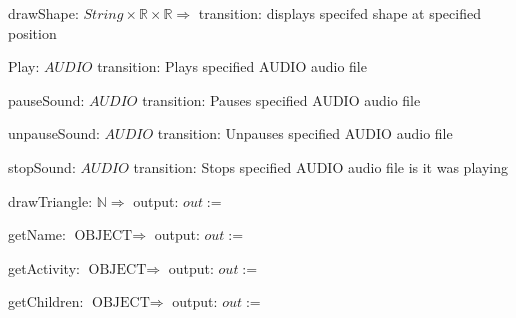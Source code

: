 \documentclass[12pt]{article}
\begin{document}
\noindent drawShape: $String\times\mathbb{R}\times\mathbb{R}\Rightarrow$
\noindent transition: displays specifed shape at specified position

\noindent Play: $AUDIO$
\noindent transition: Plays specified AUDIO audio file

\noindent pauseSound: $AUDIO$
\noindent transition: Pauses specified AUDIO audio file

\noindent unpauseSound: $AUDIO$
\noindent transition: Unpauses specified AUDIO audio file

\noindent stopSound: $AUDIO$
\noindent transition: Stops specified AUDIO audio file is it was playing



\noindent drawTriangle: $ \mathbb{N} \Rightarrow $
\noindent output: $out := $

\noindent getName: $ \mbox{OBJECT} \Rightarrow $
\noindent output: $out := $

\noindent getActivity: $ \mbox{OBJECT} \Rightarrow $
\noindent output: $out := $

\noindent getChildren: $ \mbox{OBJECT} \Rightarrow $
\noindent output: $out := $





\end{document}
